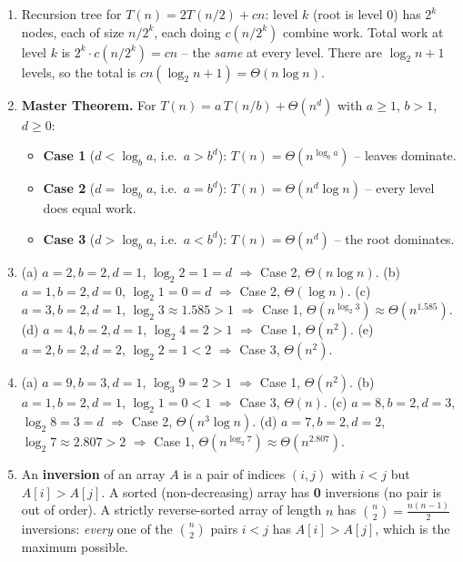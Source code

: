 \documentclass[11pt]{article}
\begin{document}
\begin{enumerate}[label=\textbf{A\arabic*.}, leftmargin=2.2em]
\item Recursion tree for $T(n) = 2T(n/2) + cn$: level $k$ (root is level $0$) has $2^k$
nodes, each of size $n/2^k$, each doing $c(n/2^k)$ combine work. Total work at level $k$ is
$2^k \cdot c(n/2^k) = cn$ -- the \emph{same} at every level. There are $\log_2 n + 1$
levels, so the total is $cn(\log_2 n + 1) = \Theta(n \log n)$.

\item \textbf{Master Theorem.} For $T(n) = a\,T(n/b) + \Theta(n^d)$ with $a \ge 1$, $b > 1$,
$d \ge 0$:
\begin{itemize}
    \item \textbf{Case 1} ($d < \log_b a$, i.e.\ $a > b^d$): $T(n) = \Theta(n^{\log_b a})$ --
    leaves dominate.
    \item \textbf{Case 2} ($d = \log_b a$, i.e.\ $a = b^d$): $T(n) = \Theta(n^d \log n)$ --
    every level does equal work.
    \item \textbf{Case 3} ($d > \log_b a$, i.e.\ $a < b^d$): $T(n) = \Theta(n^d)$ -- the root
    dominates.
\end{itemize}

\item (a) $a=2,b=2,d=1$, $\log_2 2 = 1 = d$ $\Rightarrow$ Case 2, $\Theta(n \log n)$. (b)
$a=1,b=2,d=0$, $\log_2 1 = 0 = d$ $\Rightarrow$ Case 2, $\Theta(\log n)$. (c) $a=3,b=2,d=1$,
$\log_2 3 \approx 1.585 > 1$ $\Rightarrow$ Case 1, $\Theta(n^{\log_2 3}) \approx
\Theta(n^{1.585})$. (d) $a=4,b=2,d=1$, $\log_2 4 = 2 > 1$ $\Rightarrow$ Case 1,
$\Theta(n^2)$. (e) $a=2,b=2,d=2$, $\log_2 2 = 1 < 2$ $\Rightarrow$ Case 3, $\Theta(n^2)$.

\item (a) $a=9,b=3,d=1$, $\log_3 9 = 2 > 1$ $\Rightarrow$ Case 1, $\Theta(n^2)$. (b)
$a=1,b=2,d=1$, $\log_2 1 = 0 < 1$ $\Rightarrow$ Case 3, $\Theta(n)$. (c) $a=8,b=2,d=3$,
$\log_2 8 = 3 = d$ $\Rightarrow$ Case 2, $\Theta(n^3 \log n)$. (d) $a=7,b=2,d=2$, $\log_2 7
\approx 2.807 > 2$ $\Rightarrow$ Case 1, $\Theta(n^{\log_2 7}) \approx \Theta(n^{2.807})$.

\item An \textbf{inversion} of an array $A$ is a pair of indices $(i,j)$ with $i < j$ but
$A[i] > A[j]$. A sorted (non-decreasing) array has \textbf{0} inversions (no pair is out of
order). A strictly reverse-sorted array of length $n$ has \textbf{$\binom{n}{2} =
\frac{n(n-1)}{2}$} inversions: \emph{every} one of the $\binom{n}{2}$ pairs $i < j$ has
$A[i] > A[j]$, which is the maximum possible.


\end{enumerate}
\end{document}
